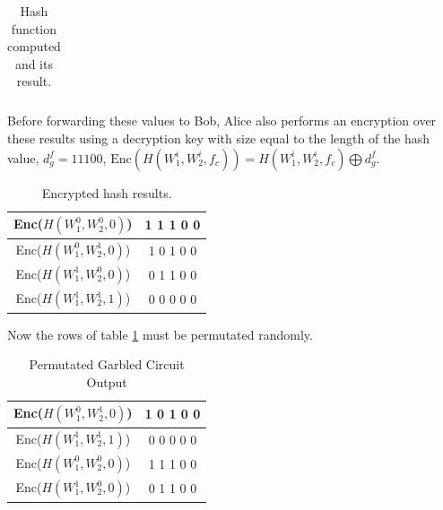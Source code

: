 \begin{refsection}
\begin{table}[H]
\begin{tabular}{|c|c|c|c|c|c|c|}
    \end{tabular}
    \caption{Hash function computed and its result.}
\end{table}

Before forwarding these values to Bob, Alice also performs an encryption over these results using a decryption key with size equal to the length of the hash value, $d_g^f = 1 1 1 0 0$, $\textrm{Enc}(H(W_1^i,W_2^i,f_c )) = H(W_1^i,W_2^i,f_c) \bigoplus d_g^f $.

\begin{table}[H]
    \centering
    \begin{tabular}{|c|c|}
    \hline
    Enc($H(W_1^0,W_2^0,0)$)             &    1 1 1 0 0                                      \\ \hline
    Enc($H(W_1^0,W_2^1,0)$)             &    1 0 1 0 0                                     \\ \hline
    Enc($H(W_1^1,W_2^0,0)$)             &    0 1 1 0 0                                     \\ \hline
    Enc($H(W_1^1,W_2^1,1)$)             &    0 0 0 0 0                                     \\ \hline
    \end{tabular}
    \caption{Encrypted hash results.} \label{tb:encryptedhash}
\end{table}
 Now the rows of table \ref{tb:encryptedhash} must be permutated randomly.

\begin{table}[H]
    \centering
    \begin{tabular}{|c|c|}
    \hline
    Enc($H(W_1^0,W_2^1,0)$)             &    1 0 1 0 0                                     \\ \hline
    Enc($H(W_1^1,W_2^1,1)$)             &    0 0 0 0 0                                     \\ \hline
    Enc($H(W_1^0,W_2^0,0)$)             &    1 1 1 0 0                                     \\ \hline
    Enc($H(W_1^1,W_2^0,0)$)             &    0 1 1 0 0                                     \\ \hline
    \end{tabular}
    \caption{Permutated Garbled Circuit Output}
\end{table}



\end{refsection}
